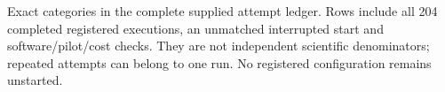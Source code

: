 \clearpage
\begin{table}[p]
\caption{Exact categories in the complete supplied attempt ledger. Rows include all 204 completed registered executions, an unmatched interrupted start and software/pilot/cost checks. They are not independent scientific denominators; repeated attempts can belong to one run. No registered configuration remains unstarted.}
\label{tab:attempts}
\centering

\end{table}
